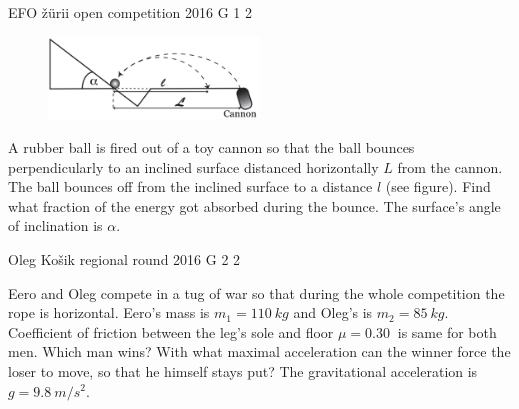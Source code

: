 \documentclass[11pt]{article}
\begin{document}
{EFO žürii} %
{open competition} %
{2016} %
{G 1} %
{2} %
{

\ifEngStatement
\begin{figure}
  \vspace{-20pt}
  \begin{center}
    \includegraphics[width=0.5\textwidth]{2016-lahg-01-kaldjoonis_ing}
  \end{center}
  \vspace{-30pt}
\end{figure}
A rubber ball is fired out of a toy cannon so that the ball bounces perpendicularly to an inclined surface distanced horizontally $L$ from the cannon. The ball bounces off from the inclined surface to a distance $l$ (see figure). Find what fraction of the energy got absorbed during the bounce. The surface’s angle of inclination is $\alpha$.
\fi
}

{Oleg Košik} %
{regional round} %
{2016} %
{G 2} %
{2} %
{

\ifEngStatement
Eero and Oleg compete in a tug of war so that during the whole competition the rope is horizontal. Eero’s mass is $m_1=\SI{110}{kg}$ and Oleg’s is $m_2=\SI{85}{kg}$. Coefficient of friction between the leg’s sole and floor $\mu=\SI{0,30}{}$ is same for both men. Which man wins? With what maximal acceleration can the winner force the loser to move, so that he himself stays put? The gravitational acceleration is $g=\SI{9,8}{m/s^2}$.
\fi
}
\end{document}
